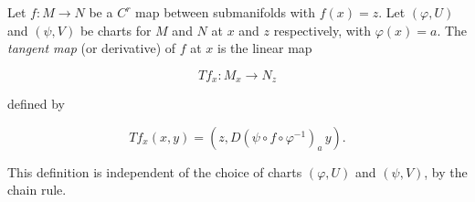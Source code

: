 Let $f: M \to N$ be a $C^r$ map between submanifolds with $f(x) = z$. Let $(\varphi, U)$ and $(\psi, V)$ be charts for $M$ and $N$ at $x$ and $z$ respectively, with $\varphi(x) = a$. The \textit{tangent map} (or derivative) of $f$ at $x$ is the linear map

$$Tf_x: M_x \to N_z$$

defined by

$$Tf_x(x, y) = (z, D(\psi \circ f \circ \varphi^{-1})_a \, y).$$

This definition is independent of the choice of charts $(\varphi, U)$ and $(\psi, V)$, by the chain rule.
